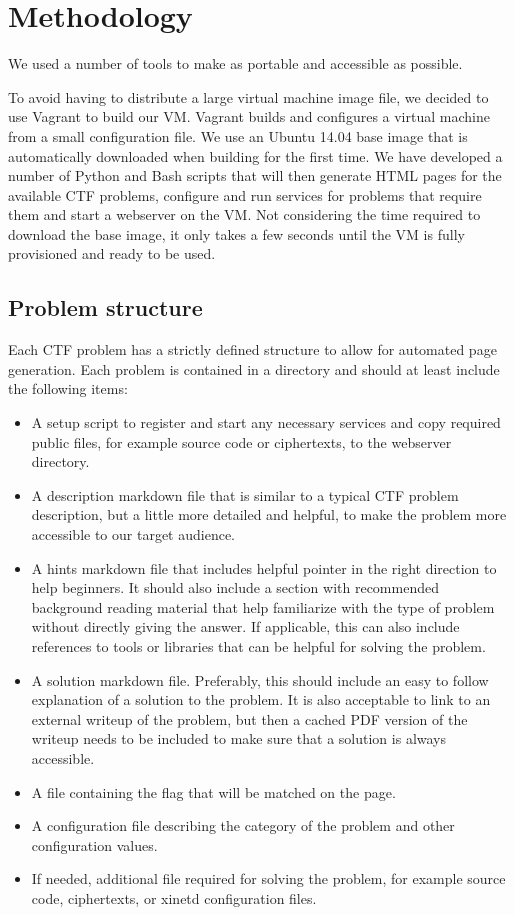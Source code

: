 \section{Methodology}
\label{sec:methodology}
We used a number of tools to make \cvm{} as portable and accessible as possible.

To avoid having to distribute a large virtual machine image file, we decided to use Vagrant to build our VM. Vagrant builds and configures a virtual machine from a small configuration file. We use an Ubuntu 14.04 base image that is automatically downloaded when building \cvm{} for the first time. We have developed a number of Python and Bash scripts that will then generate HTML pages for the available CTF problems, configure and run services for problems that require them and start a webserver on the VM. Not considering the time required to download the base image, it only takes a few seconds until the VM is fully provisioned and ready to be used. 

\subsection{Problem structure}
Each CTF problem has a strictly defined structure to allow for automated page generation. Each problem is contained in a directory and should at least include the following items:

\begin{itemize}
  \item A setup script to register and start any necessary services and copy required public files, for example source code or ciphertexts, to the webserver directory. 
  \item A description markdown file that is similar to a typical CTF problem description, but a little more detailed and helpful, to make the problem more accessible to our target audience.
  \item A hints markdown file that includes helpful pointer in the right direction to help beginners. It should also include a section with recommended background reading material that help familiarize with the type of problem without directly giving the answer. If applicable, this can also include references to tools or libraries that can be helpful for solving the problem.
  \item A solution markdown file. Preferably, this should include an easy to follow explanation of a solution to the problem. It is also acceptable to link to an external writeup of the problem, but then a cached PDF version of the writeup needs to be included to make sure that a solution is always accessible.
  \item A file containing the flag that will be matched on the page.
  \item A configuration file describing the category of the problem and other configuration values.
  \item If needed, additional file required for solving the problem, for example source code, ciphertexts, or xinetd configuration files.
\end{itemize}

